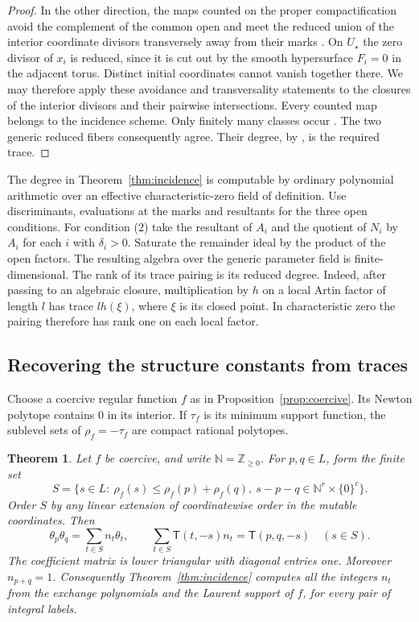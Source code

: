 \documentclass[11pt,reqno]{amsart}
\numberwithin{equation}{section}
\newtheorem{theorem}{Theorem}[section]
\theoremstyle{definition}
\theoremstyle{remark}
\begin{document}
\begin{proof}
In the other direction, the maps counted on the proper
compactification avoid the complement of the common open and meet
the reduced union of the interior coordinate divisors transversely
away from their marks \cite[Lemmas~3.6, 3.9 and~3.12]{KY}. On
\(U_\star\) the zero divisor of \(x_i\) is reduced, since it is cut
out by the smooth hypersurface \(F_i=0\) in the adjacent torus.
Distinct initial coordinates cannot vanish together there.
We may therefore apply these avoidance and transversality statements
to the closures of the interior divisors and their pairwise
intersections. Every counted map belongs to the incidence scheme.
Only finitely many classes occur \cite[Lemma~3.8]{KY}. The two
generic reduced fibers consequently agree. Their degree, by
\cite[Theorem~1.2 and Proposition~3.13]{KY}, is the required trace.
\end{proof}

The degree in Theorem~\ref{thm:incidence} is computable by
ordinary polynomial arithmetic over an effective characteristic-zero
field of definition. Use discriminants, evaluations at the marks and
resultants for the three open conditions. For condition (2) take the
resultant of \(A_i\) and the quotient of \(N_i\) by \(A_i\) for each
\(i\) with \(\delta_i>0\). Saturate the remainder ideal by the
product of the open factors. The resulting algebra over the generic
parameter field is finite-dimensional. The rank of its trace
pairing is its reduced degree. Indeed, after passing to an algebraic
closure, multiplication by \(h\) on a local Artin factor of length
\(l\) has trace \(l h(\xi)\), where \(\xi\) is its closed point.
In characteristic zero the pairing therefore has rank one on each local factor.

\subsection{Recovering the structure constants from traces}

Choose a coercive regular function \(f\) as in Proposition~\ref{prop:coercive}.
Its Newton polytope contains \(0\) in its interior. If \(\tau_f\) is its
minimum support function, the sublevel sets of \(\rho_f=-\tau_f\) are compact
rational polytopes.

\begin{theorem}\label{thm:corner-free-product}
Let \(f\) be coercive, and write \(\mathbb N=\mathbb Z_{\ge0}\).
For \(p,q\in L\), form the finite set
\[ S=\{s\in L:\ \rho_f(s)\le\rho_f(p)+\rho_f(q),\ s-p-q\in\mathbb N^r\times\{0\}^{c}\}. \]
Order \(S\) by any linear extension of coordinatewise order in the
mutable coordinates. Then
\begin{equation}\label{eq:theta-trace-system}
\theta_p\theta_q=\sum_{t\in S} n_t\theta_t,\qquad \sum_{t\in S}\mathsf T(t,-s)n_t=\mathsf T(p,q,-s)\quad (s\in S).
\end{equation}
The coefficient matrix is lower triangular with diagonal entries one.
Moreover \(n_{p+q}=1\).
Consequently Theorem~\ref{thm:incidence} computes all the
integers \(n_t\) from the exchange polynomials and the Laurent
support of \(f\), for every pair of integral labels.
\end{theorem}
\end{document}
